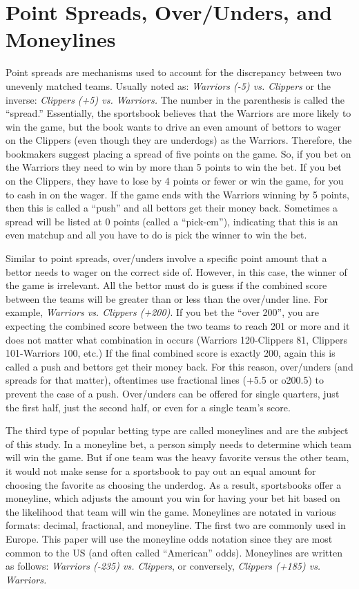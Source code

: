 \documentclass [MS] {uclathes}
\begin{document}
\section{Point Spreads, Over/Unders, and Moneylines}
Point spreads are mechanisms used to account for the discrepancy between two unevenly matched teams. Usually noted as: \emph{Warriors (-5) vs. Clippers} or the inverse: \emph{Clippers (+5) vs. Warriors.} The number in the parenthesis is called the ``spread.'' Essentially, the sportsbook believes that the Warriors are more likely to win the game, but the book wants to drive an even amount of bettors to wager on the Clippers (even though they are underdogs) as the Warriors. Therefore, the bookmakers suggest placing a spread of five points on the game. So, if you bet on the Warriors they need to win by more than 5 points to win the bet. If you bet on the Clippers, they have to lose by 4 points or fewer or win the game, for you to cash in on the wager. If the game ends with the Warriors winning by 5 points, then this is called a ``push'' and all bettors get their money back. Sometimes a spread will be listed at 0 points (called a ``pick-em''), indicating that this is an even matchup and all you have to do is pick the winner to win the bet.

Similar to point spreads, over/unders involve a specific point amount that a bettor needs to wager on the correct side of. However, in this case, the winner of the game is irrelevant. All the bettor must do is guess if the combined score between the teams will be greater than or less than the over/under line. For example, \emph{Warriors vs. Clippers (+200)}. If you bet the ``over 200'', you are expecting the combined score between the two teams to reach 201 or more and it does not matter what combination in occurs (Warriors 120-Clippers 81, Clippers 101-Warriors 100, etc.) If the final combined score is exactly 200, again this is called a push and bettors get their money back. For this reason, over/unders (and spreads for that matter), oftentimes use fractional lines (+5.5 or o200.5) to prevent the case of a push. Over/unders can be offered for single quarters, just the first half, just the second half, or even for a single team's score.

The third type of popular betting type are called moneylines and are the subject of this study. In a moneyline bet, a person simply needs to determine which team will win the game. But if one team was the heavy favorite versus the other team, it would not make sense for a sportsbook to pay out an equal amount for choosing the favorite as choosing the underdog. As a result, sportsbooks offer a moneyline, which adjusts the amount you win for having your bet hit based on the likelihood that team will win the game. Moneylines are notated in various formats: decimal, fractional, and moneyline. The first two are commonly used in Europe. This paper will use the moneyline odds notation since they are most common to the US (and often called ``American'' odds). Moneylines are written as follows: \emph{Warriors (-235) vs. Clippers}, or conversely, \emph{Clippers (+185) vs. Warriors.} 
\end{document}
